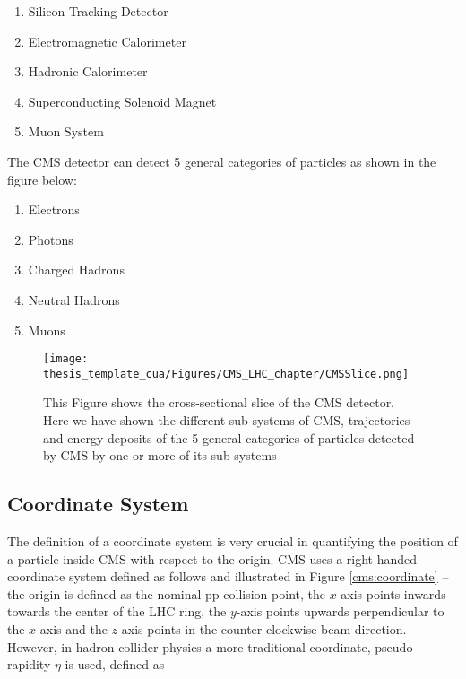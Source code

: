 \begin{enumerate}
    \item Silicon Tracking Detector
    \item Electromagnetic Calorimeter
    \item Hadronic Calorimeter
    \item Superconducting Solenoid Magnet
    \item Muon System
    
    
\end{enumerate}
The CMS detector can detect 5 general categories of particles as shown in the figure below:
 \begin{enumerate}
    \item Electrons
    \item Photons
    \item Charged Hadrons
    \item Neutral Hadrons
    \item Muons
\end{enumerate}

\begin{figure} [tpb]
\centering
         \texttt{[image: thesis\_template\_cua/Figures/CMS\_LHC\_chapter/CMSSlice.png]}
         \vspace*{10mm}
         \caption[CMS Slice]{This Figure shows the cross-sectional slice of the CMS detector. Here we have shown the different sub-systems of CMS, trajectories and energy deposits of the 5 general categories of particles detected by CMS by one or more of its sub-systems}
         \label{cms:slice}
\end{figure}
\subsection{Coordinate System}
The definition of a coordinate system is very crucial in quantifying the position of a particle inside CMS with respect to the origin. CMS uses a right-handed coordinate system defined as follows and illustrated in Figure \ref{cms:coordinate} -- the origin is defined as the nominal pp collision point,  the  $x$-axis points inwards towards the center of the LHC ring, the $y$-axis points upwards perpendicular to the $x$-axis and the $z$-axis points in the counter-clockwise beam direction. However, in hadron collider physics a more traditional coordinate, pseudo-rapidity $\eta$ is used, defined as

